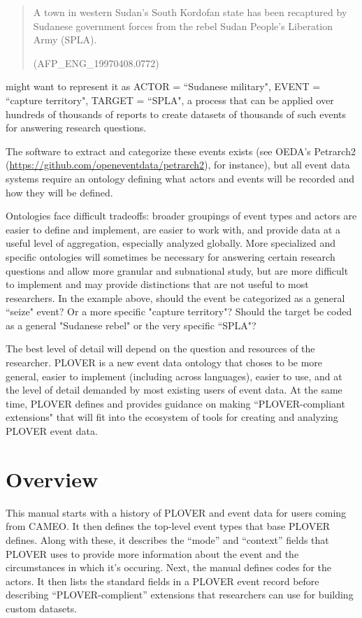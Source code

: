 \documentclass[11pt]{report}
\begin{document}
\begin{quotation}
A town in western Sudan's South Kordofan state has been recaptured by Sudanese
government forces from the rebel Sudan People's Liberation Army (SPLA).

(AFP\_ENG\_19970408.0772)
\end{quotation}

might want to represent it as ACTOR = ``Sudanese military", EVENT = ``capture
territory", TARGET = ``SPLA", a process that can be applied over hundreds of
thousands of reports to create datasets of thousands of such events for
answering research questions.

The software to extract and categorize these events exists (see OEDA's
Petrarch2 (\url{https://github.com/openeventdata/petrarch2}), for instance), but all
event data systems require an ontology defining what actors and events will be
recorded and how they will be defined.

Ontologies face difficult tradeoffs: broader groupings of event types and
actors are easier to define and implement, are easier to work with, and provide
data at a useful level of aggregation, especially analyzed globally. More
specialized and specific ontologies will sometimes be necessary for answering
certain research questions and allow more granular and subnational study, but
are more difficult to implement and may provide distinctions that are not
useful to most researchers. In the example above, should the event be
categorized as a general ``seize" event? Or a more specific "capture territory"?
Should the target be coded as a general "Sudanese rebel" or the very specific
``SPLA"? 

The best level of detail will depend on the question and resources of the
researcher.  PLOVER is a new event data ontology that choses to be more
general, easier to implement (including across languages), easier to use, and at the level of
detail demanded by most existing users of event data. At the same time, PLOVER
defines and provides guidance on making ``PLOVER-compliant extensions" that will
fit into the ecosystem of tools for creating and analyzing PLOVER event data.

\section{Overview}

This manual starts with a history of PLOVER and event data for users coming from CAMEO. It then defines the top-level event types that base PLOVER defines. Along with these, it describes the ``mode'' and ``context'' fields that PLOVER uses to provide more information about the event and the circumstances in which it's occuring. Next, the manual defines codes for the actors. It then lists the standard fields in a PLOVER event record before describing ``PLOVER-complient'' extensions that researchers can use for building custom datasets.
\end{document}
